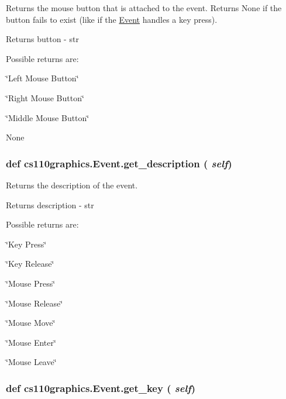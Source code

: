 Returns the mouse button that is attached to the event. Returns {\ttfamily None} if the button fails to exist (like if the \hyperlink{classcs110graphics_1_1Event}{Event} handles a key press). \begin{DoxyReturn}{Returns}
button -\/ str
\end{DoxyReturn}
Possible returns are:
\begin{DoxyItemize}
\item \char`\"{}Left Mouse Button\char`\"{}
\item \char`\"{}Right Mouse Button\char`\"{}
\item \char`\"{}Middle Mouse Button\char`\"{}
\item None 
\end{DoxyItemize}\hypertarget{classcs110graphics_1_1Event_a7bd201ecbf74db6d78dbf2fb4f622a7c}{
\subsubsection[{get\_\-description}]{\setlength{\rightskip}{0pt plus 5cm}def cs110graphics.Event.get\_\-description ( {\em self})}}
\label{classcs110graphics_1_1Event_a7bd201ecbf74db6d78dbf2fb4f622a7c}


Returns the description of the event. \begin{DoxyReturn}{Returns}
description -\/ str
\end{DoxyReturn}
Possible returns are:
\begin{DoxyItemize}
\item \char`\"{}Key Press\char`\"{}
\item \char`\"{}Key Release\char`\"{}
\item \char`\"{}Mouse Press\char`\"{}
\item \char`\"{}Mouse Release\char`\"{}
\item \char`\"{}Mouse Move\char`\"{}
\item \char`\"{}Mouse Enter\char`\"{}
\item \char`\"{}Mouse Leave\char`\"{} 
\end{DoxyItemize}\hypertarget{classcs110graphics_1_1Event_a0d795ddaef92049cee1d7b09898cf225}{
\subsubsection[{get\_\-key}]{\setlength{\rightskip}{0pt plus 5cm}def cs110graphics.Event.get\_\-key ( {\em self})}}
\label{classcs110graphics_1_1Event_a0d795ddaef92049cee1d7b09898cf225}


